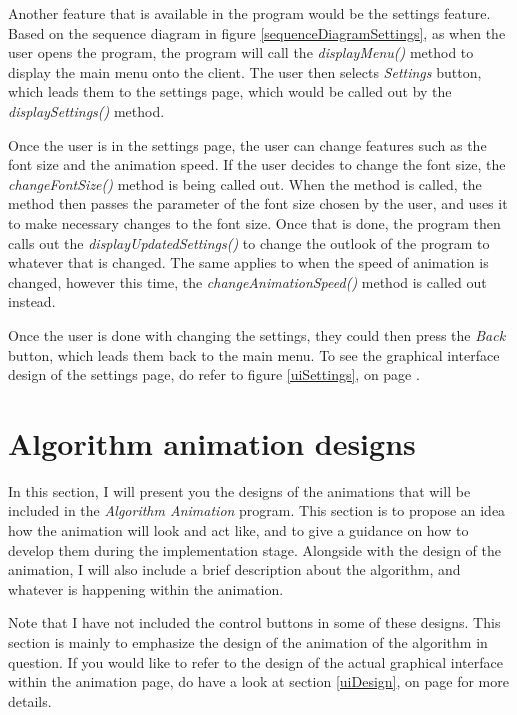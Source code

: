 Another feature that is available in the program would be the settings feature. Based on the sequence diagram in figure \ref{sequenceDiagramSettings}, as when the user opens the program, the program will call the \textit{displayMenu()} method to display the main menu onto the client. The user then selects \textit{Settings} button, which leads them to the settings page, which would be called out by the \textit{displaySettings()} method.

Once the user is in the settings page, the user can change features such as the font size and the animation speed. If the user decides to change the font size, the \textit{changeFontSize()} method is being called out. When the method is called, the method then passes the parameter of the font size chosen by the user, and uses it to make necessary changes to the font size. Once that is done, the program then calls out the \textit{displayUpdatedSettings()} to change the outlook of the program to whatever that is changed. The same applies to when the speed of animation is changed, however this time, the \textit{changeAnimationSpeed()} method is called out instead. 

Once the user is done with changing the settings, they could then press the \textit{Back} button, which leads them back to the main menu. To see the graphical interface design of the settings page, do refer to figure \ref{uiSettings}, on page \pageref{uiSettings}.

\newpage

\section{Algorithm animation designs} \label{sec:algorithmAnimationDesign}
In this section, I will present you the designs of the animations that will be included in the \textit{Algorithm Animation} program. This section is to propose an idea how the animation will look and act like, and to give a guidance on how to develop them during the implementation stage. Alongside with the design of the animation, I will also include a brief description about the algorithm, and whatever is happening within the animation.

Note that I have not included the control buttons in some of these designs. This section is mainly to emphasize the design of the animation of the algorithm in question. If you would like to refer to the design of the actual graphical interface within the animation page, do have a look at section \ref{uiDesign}, on page \pageref{uiDesign} for more details.

